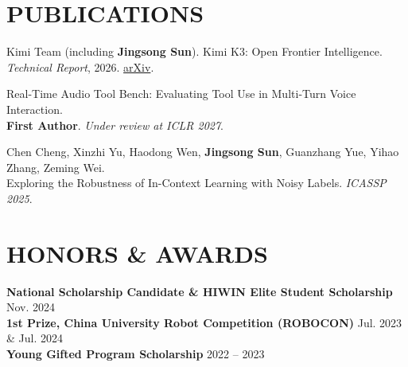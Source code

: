 \documentclass[a4paper,9pt]{extarticle}
\begin{document}
\section*{PUBLICATIONS}
    \noindent
    Kimi Team (including \textbf{Jingsong Sun}). Kimi K3: Open Frontier Intelligence. \\
    \textit{Technical Report}, 2026. \href{https://arxiv.org/abs/2607.24653}{arXiv}.

    \medskip
    \noindent
    Real-Time Audio Tool Bench: Evaluating Tool Use in Multi-Turn Voice Interaction. \\
    \textbf{First Author}. \textit{Under review at ICLR 2027}.

    \medskip
    \noindent
    Chen Cheng, Xinzhi Yu, Haodong Wen, \textbf{Jingsong Sun}, Guanzhang Yue, Yihao Zhang, Zeming Wei. \\
    Exploring the Robustness of In-Context Learning with Noisy Labels. \textit{ICASSP 2025}.

\section*{HONORS \& AWARDS}
    \noindent
    \textbf{National Scholarship Candidate \& HIWIN Elite Student Scholarship} \hfill Nov. 2024 \\
    \textbf{1st Prize, China University Robot Competition (ROBOCON)} \hfill Jul. 2023 \& Jul. 2024 \\
    \textbf{Young Gifted Program Scholarship} \hfill 2022 -- 2023
\end{document}

